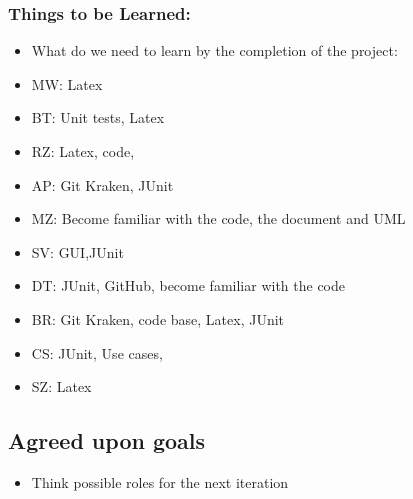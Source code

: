 \documentclass[12pt]{article}
\begin{document}
	\subsubsection{Things to be Learned:}
	\begin{itemize}
		\item What do we need to learn by the completion of the project: 
		\item MW: Latex 
		\item BT: Unit tests, Latex 
		\item RZ: Latex, code, 
		\item AP: Git Kraken, JUnit 
		\item MZ: Become familiar with the code, the document and UML 
		\item SV: GUI,JUnit
		\item DT: JUnit, GitHub, become familiar with the code
		\item BR: Git Kraken, code base, Latex, JUnit 
		\item CS: JUnit, Use cases,
		\item SZ: Latex 
	\end{itemize}
	
	\subsection{Agreed upon goals}

	\begin{itemize}
		\item Think possible roles for the next iteration 
		
	\end{itemize}
	\pagebreak
	
\end{document}
